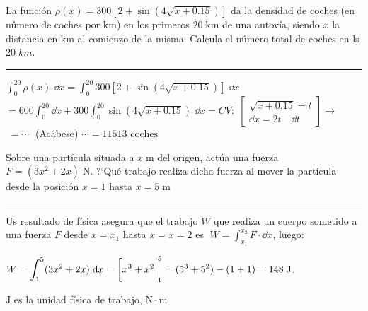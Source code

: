 \begin{miejercicio}
	
La función $\rho (x)=300 \left[ 2+\sin(4\sqrt{x+0.15}) \right]$ da la densidad de coches (en número de coches por $\mathrm{km}$) en los primeros $20\; \mathrm{km}$ de una autovía, siendo $x$ la distancia en $\mathrm{km}$ al comienzo de la misma. Calcula el número total de coches en ls $20 \; km$.  

\rule{200pt}{0.1pt}

\vspace{3mm}
	
	$\displaystyle \int_0^{20} \rho (x) \; \dd x= \int_0^{20} 300 \left [2+\sin(4\sqrt{x+0.15}) \right]   \; \dd x$
	$\displaystyle = 600 \int_0^{20} \dd x + 300 \int_0^{20}  \sin (4\sqrt{x+0.15}) \; \dd x = 
	CV:\; \left[ \begin{matrix} \sqrt { x+0.15 } =t \\ \dd x=2t\quad \dd t \end{matrix} \right] \to $
	$ \; =\cdots\; $ (\textcolor{gris}{Acábese}) $ \cdots   =11513 \text{ coches } $
\end{miejercicio}	
	
	
\vspace{5mm}

\begin{miejercicio}
	
Sobre una partícula situada a $x\; \mathrm{m}$ del origen, actúa una fuerza $F=(3x^2+2x)\; \mathrm{N}$. ?`Qué trabajo realiza dicha fuerza al mover la partícula desde la posición $x=1$ hasta $x=5\; \mathrm{m}$
	
\rule{200pt}{0.1pt}

\vspace{3mm}
	
	Us resultado de física asegura que el trabajo $W$ que realiza un cuerpo sometido a una fuerza $F$ desde $x=x_1$ hasta $x= x=2$ es  $\; W=\displaystyle \int_{x_1}^{x_2} F \cdot \dd x $, luego:
	
	$W=\displaystyle \int_1^5 (3x^2+2x)\; \dd x = \eval[x^3+x^2|_1^5=(5^3+5^2)-(1+1)= 148\; \mathrm{J}$. 
	
	\vspace{2mm}\textcolor{gris}{$\mathrm{J}$ es la unidad física de trabajo, $\mathrm{N}\cdot \mathrm{m}$}

\end{miejercicio}
	
	\vspace{5mm}

